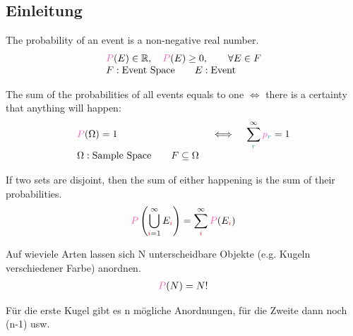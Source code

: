 \subsection{Einleitung}
\label{subsec:Einleitung}
\begin{axiombox}\nospacing
  \begin{axiom}
    The probability of an event is a non-negative real number.
    \begin{align}
      &\Pb(E)\in\R,\quad\Pb(E)\geq0,\qquad\forall E\in F\nalign
      &F: \text{Event Space}\qquad E: \text{Event}\nonumber
    \end{align}
  \end{axiom}
\end{axiombox}
\begin{axiombox}\nospacing
  \begin{axiom}\label{axiom:probSum}\leavevmode
  The sum of the probabilities of all events equals to one $\iff$ there is a
  certainty that anything will happen:
    \begin{align}
     &\Pb(\Omega)=1&&\iff&&\sum_{\idxr}^{\infty}\pb_{\idxr}=1\label{eq:probSum}\nalign
      &\Omega: \text{Sample Space}\qquad F\subseteq\Omega\nonumber
    \end{align}
  \end{axiom}
\end{axiombox}
\begin{axiombox}\nospacing
  \begin{axiom}
    If two sets are disjoint, then the sum of either happening is the sum of their probabilities.
    \begin{align}
      \Pb \left(\bigcup\limits_{\idxi=1}^{\infty}E_{\idxi}\right)=\sum_{\idxi}^{\infty}\Pb(E_{\idxi})
    \end{align}
  \end{axiom}
\end{axiombox}
\begin{defnbox}\nospacing
  \begin{defn}[Permutation $N!$]
    Auf wieviele Arten lassen sich N unterscheidbare Objekte (e.g. Kugeln verschiedener Farbe) anordnen.
    \begin{align}
      \Pb(N)=N!
    \end{align}
  \end{defn}
\end{defnbox}
\begin{notebox}[Bemerkung]\nospacing
  Für die erste Kugel gibt es n mögliche Anordnungen, für die Zweite dann noch (n-1) usw.
\end{notebox}
